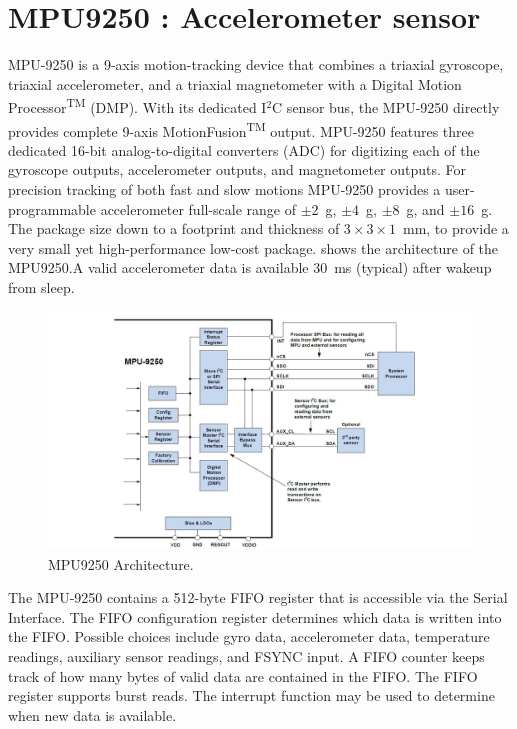 \section{MPU9250 : Accelerometer sensor}
\label{mpu9250_def}

MPU-9250 is a 9-axis motion-tracking device that combines a triaxial
gyroscope, triaxial accelerometer, and a triaxial magnetometer with a
Digital Motion Processor\textsuperscript{TM} (DMP). With its
dedicated I$^2$C sensor bus, the MPU-9250 directly provides complete
9-axis MotionFusion\textsuperscript{TM} output. MPU-9250 features
three dedicated 16-bit analog-to-digital converters (ADC) for
digitizing each of the gyroscope outputs, accelerometer outputs, and
magnetometer outputs. For precision tracking of both fast and slow
motions MPU-9250 provides a user-programmable accelerometer
full-scale range of $\pm2$~g, $\pm4$~g, $\pm8$~g, and $\pm16$~g. The
package size down to a footprint and thickness of
$3\times3\times1$~mm, to provide a very small yet high-performance
low-cost package.  shows the architecture of the
MPU9250.A valid accelerometer data is available 30~ms (typical) after
wakeup from sleep.

\begin{figure}
	\centering
	\includegraphics[scale = 0.6]{MPU9250}
\caption{MPU9250 Architecture. \cite{mpu}}
\label{mpu9250}
\end{figure}

The MPU-9250 contains a 512-byte FIFO register that is accessible via
the Serial Interface. The FIFO configuration register determines
which data is written into the FIFO. Possible choices include gyro
data, accelerometer data, temperature readings, auxiliary sensor
readings, and FSYNC input. A FIFO counter keeps track of how many
bytes of valid data are contained in the FIFO. The FIFO register
supports burst reads. The interrupt function may be used to determine
when new data is available. 

